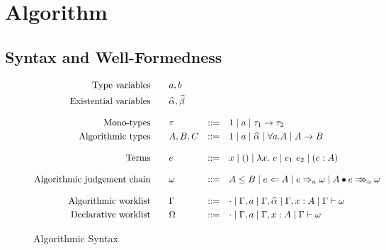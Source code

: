 \section{Algorithm}

\subsection{Syntax and Well-Formedness}

\begin{figure}
\begin{gather*}
\begin{aligned}
\text{Type variables}\qquad&a, b\\
\text{Existential variables}\qquad&\al, \bt
\\[3mm]
\text{Mono-types}\qquad&\tau &::=&\quad 1 \mid a \mid \tau_1\to \tau_2\\
\text{Algorithmic types}\qquad&A, B, C &::=&\quad 1 \mid a \mid \al \mid \forall a. A \mid A\to B
\\[3mm]
\text{Terms}\qquad&e&::=&\quad x \mid () \mid \lam{e} \mid e_1~e_2 \mid (e:A)
\\[3mm]
\text{Algorithmic judgement chain}\qquad&\jg &::=&\quad A \le B \mid e\Lto A \mid e\To_{a} \jg \mid \appInfAlg{A}{e}
\\[3mm]
\text{Algorithmic worklist}\qquad&\Gm &::=&\quad \cdot \mid \Gm, a \mid \Gm, \al \mid \Gm, x: A \mid \Gm \vdash \jg\\
\text{Declarative worklist}\qquad&\Om &::=&\quad \cdot \mid \Gm, a \mid \Gm, x: A \mid \Gm \vdash \jg
\end{aligned}
\end{gather*}
\caption{Algorithmic Syntax}\label{fig:alg_syntax}
\end{figure}

